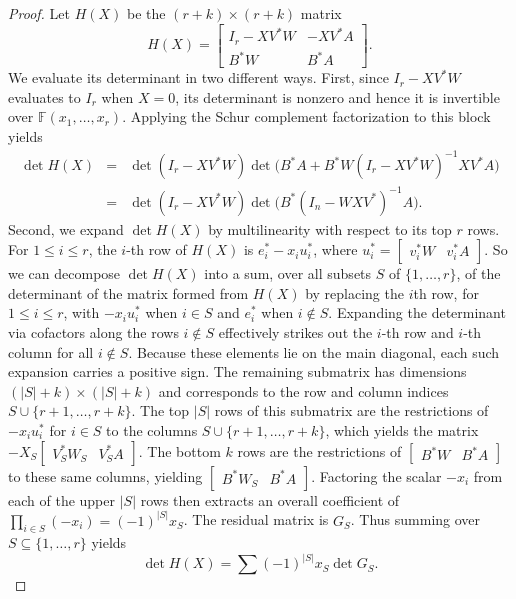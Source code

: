 \documentclass[10pt,a4paper]{amsart}
\begin{document}
\begin{proof}
Let $H(X)$ be the $(r + k) \times (r + k)$ matrix $$H(X) = \left[\begin{matrix} I_r - X V^* W & -X V^* A \\ B^* W & B^* A \end{matrix}\right].$$ We evaluate its determinant in two different ways. First, since $I_r - X V^* W$ evaluates to $I_r$ when $X = 0$, its determinant is nonzero and hence it is invertible over $\mathbb{F}(x_1, \dots, x_r)$. Applying the Schur complement factorization to this block yields \begin{eqnarray*}\det H(X) &=& \det(I_r - X V^* W) \det\Big( B^*A + B^*W (I_r - X V^* W)^{-1} X V^*A\Big)\\ &=& \det(I_r - X V^* W) \det\Big( B^* (I_n - W X V^*)^{-1} A \Big).\end{eqnarray*} Second, we expand $\det H(X)$ by multilinearity with respect to its top $r$ rows. For $1 \le i \le r$, the $i$-th row of $H(X)$ is $e_i^* - x_i u_i^*$, where $u_i^* = \left[\begin{matrix} v_i^* W & v_i^* A \end{matrix}\right]$. So we can decompose $\det H(X)$ into a sum, over all subsets $S$ of $\{1, \ldots, r\}$, of the determinant of the matrix formed from $H(X)$ by replacing the $i$th row, for $1 \leq i \leq r$, with $-x_i u_i^*$ when $i \in S$ and $e_i^*$ when $i \notin S$. Expanding the determinant via cofactors along the rows $i \not\in S$ effectively strikes out the $i$-th row and $i$-th column for all $i \notin S$. Because these elements lie on the main diagonal, each such expansion carries a positive sign. The remaining submatrix has dimensions $(|S| + k) \times (|S| + k)$ and corresponds to the row and column indices $S \cup \{r+1, \dots, r+k\}$. The top $|S|$ rows of this submatrix are the restrictions of $-x_i u_i^*$ for $i \in S$ to the columns $S \cup \{r+1, \dots, r+k\}$, which yields the matrix $-X_S \left[\begin{matrix} V_S^* W_S & V_S^* A \end{matrix}\right]$. The bottom $k$ rows are the restrictions of $\left[\begin{matrix} B^* W & B^* A \end{matrix}\right]$ to these same columns, yielding $\left[\begin{matrix} B^* W_S & B^* A \end{matrix}\right]$. Factoring the scalar $-x_i$ from each of the upper $|S|$ rows then extracts an overall coefficient of $\prod_{i \in S} (-x_i) = (-1)^{|S|} x_S$. The residual matrix is $G_S$. Thus summing over $S \subseteq \{1, \ldots, r\}$ yields $$ \det H(X) = \sum (-1)^{|S|} x_S \det G_S.$$


\end{proof}
\end{document}
